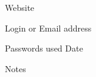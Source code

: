 \clearpage

\large

\noindent Website \
\mypagerule
\vspace{0.175in}

\noindent Login or Email address \
\mypagerule
\vspace{0.175in}

\noindent Passwords used
\hspace{1.7in}
Date \
\mypagerule
\vspace{1.6in}

\noindent Notes \
\mypagerule

\normalsize

